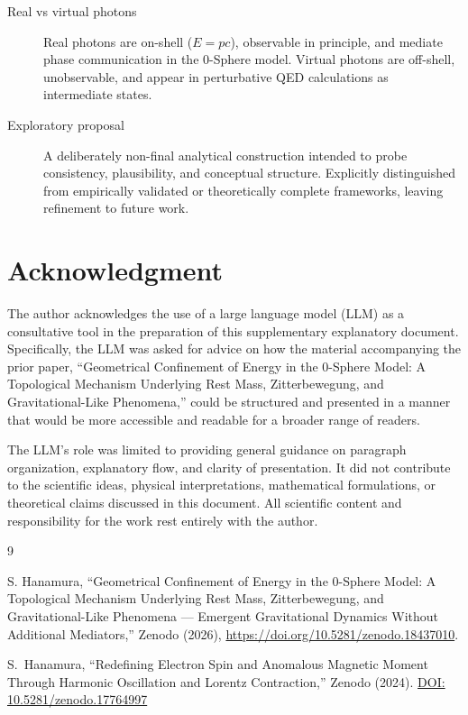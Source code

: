 \documentclass[12pt,letterpaper]{article}
\begin{document}
\begin{description}
\item[Real vs virtual photons] Real photons are on-shell ($E = pc$), observable in principle, and mediate phase communication in the 0-Sphere model. Virtual photons are off-shell, unobservable, and appear in perturbative QED calculations as intermediate states.

\item[Exploratory proposal] A deliberately non-final analytical construction intended to probe consistency, plausibility, and conceptual structure. Explicitly distinguished from empirically validated or theoretically complete frameworks, leaving refinement to future work.

\end{description}


\section*{Acknowledgment}

The author acknowledges the use of a large language model (LLM) as a consultative tool in the preparation of this supplementary explanatory document.  
Specifically, the LLM was asked for advice on how the material accompanying the prior paper, ``Geometrical Confinement of Energy in the 0-Sphere Model: A Topological Mechanism Underlying Rest Mass, Zitterbewegung, and Gravitational-Like Phenomena,'' could be structured and presented in a manner that would be more accessible and readable for a broader range of readers.  

The LLM's role was limited to providing general guidance on paragraph organization, explanatory flow, and clarity of presentation.  
It did not contribute to the scientific ideas, physical interpretations, mathematical formulations, or theoretical claims discussed in this document.  
All scientific content and responsibility for the work rest entirely with the author.


\begin{thebibliography}{9}

S. Hanamura, ``Geometrical Confinement of Energy in the 0-Sphere Model: A Topological Mechanism Underlying Rest Mass, Zitterbewegung, and Gravitational-Like Phenomena --- Emergent Gravitational Dynamics Without Additional Mediators,'' Zenodo (2026), \href{https://doi.org/10.5281/zenodo.18437010}{https://doi.org/10.5281/zenodo.18437010}.

S.~Hanamura,
``Redefining Electron Spin and Anomalous Magnetic Moment Through Harmonic Oscillation and Lorentz Contraction,''
Zenodo (2024).
\href{https://doi.org/10.5281/zenodo.17764997}{DOI: 10.5281/zenodo.17764997}

\end{thebibliography}
\end{document}
